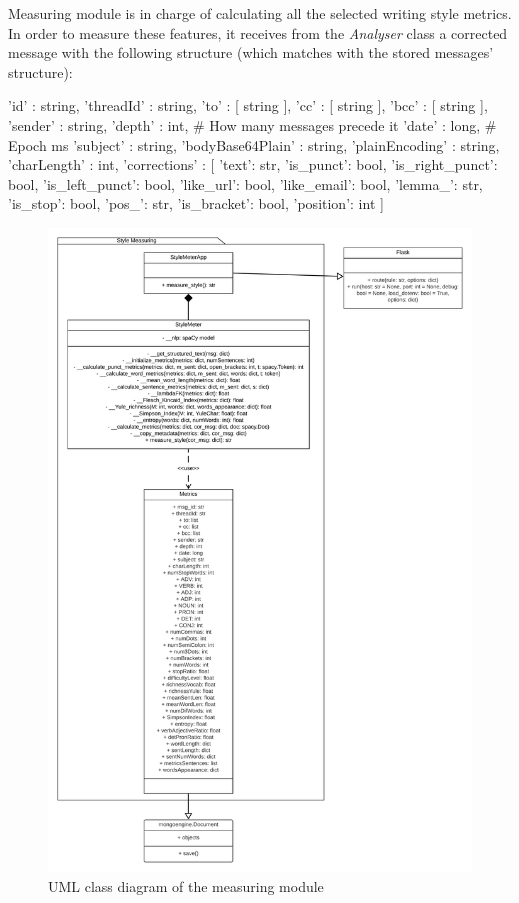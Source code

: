 Measuring module is in charge of calculating all the selected writing style metrics. In order to measure these features, it receives from the \textit{Analyser} class a corrected message with the following structure (which matches with the stored messages' structure):

\begin{python}
	{
		'id' : string,
		'threadId' : string,
		'to' : [ string ],
		'cc' : [ string ],
		'bcc' : [ string ],
		'sender' : string,
		'depth' : int,               # How many messages precede it
		'date' : long,               # Epoch ms
		'subject' : string,
		'bodyBase64Plain' : string,
		'plainEncoding' : string,
		'charLength' : int,
		'corrections' : [
		{
			'text': str,
			'is_punct': bool,
			'is_right_punct': bool,
			'is_left_punct': bool,
			'like_url': bool,
			'like_email': bool,
			'lemma_': str,
			'is_stop': bool,
			'pos_': str,
			'is_bracket': bool,
			'position': int
		}
		]
	}
\end{python}

\begin{figure}[p]
	\centering%
	\centerline{\includegraphics[height=0.85\paperheight]{Imagenes/Bitmap/metUML.png}}%
	\caption{UML class diagram of the measuring module}%
	\label{fig:umlmet}
\end{figure}

